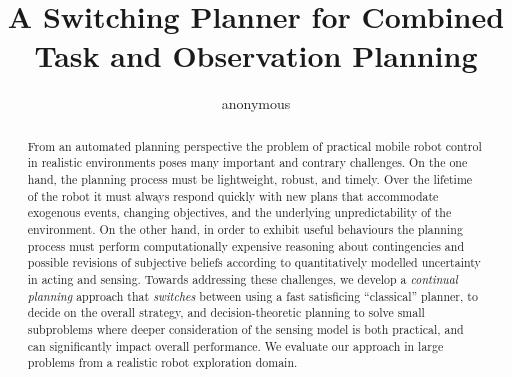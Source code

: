 \documentclass[letterpaper]{article}
\title{A Switching Planner for Combined Task and Observation Planning}
\author{anonymous}
\begin{document}
 
\maketitle

\begin{abstract}


From an automated planning perspective the problem of practical mobile
robot control in realistic environments poses many important and
contrary challenges.  On the one hand, the planning process must be
lightweight, robust, and timely. Over the lifetime of the robot it
must always respond quickly with new plans that accommodate exogenous
events, changing objectives, and the underlying unpredictability of
the environment.  On the other hand, in order to exhibit useful
behaviours the planning process must perform computationally expensive
reasoning about contingencies and possible revisions of subjective
beliefs according to quantitatively modelled uncertainty in acting and
sensing.
Towards addressing these challenges, we develop a \emph{continual
planning} approach that {\em switches} between using a fast
satisficing ``classical'' planner, to decide on the overall strategy,
and decision-theoretic planning to solve small subproblems where
deeper consideration of the sensing model is both practical, and can
significantly impact overall performance. We evaluate our approach
in large problems from a realistic robot exploration domain.






\end{abstract}

\end{document}
